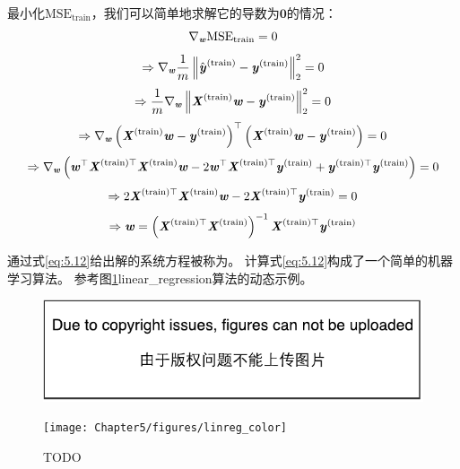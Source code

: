 最小化$\text{MSE}_{\text{train}}$，我们可以简单地求解它的导数为$\mathbf{0}$的情况：
\begin{equation}
\nabla_{\boldsymbol{\mathit{w}}} \text{MSE}_{\text{train}} = 0
\end{equation}
\begin{equation}
\Rightarrow \nabla_{\boldsymbol{\mathit{w}}} \frac{1}{m} \left\lVert \hat{\boldsymbol{\mathit{y}}}^{(\text{train})} - \boldsymbol{\mathit{y}}^{(\text{train})}\right\rVert_2^2 = 0
\end{equation}
\begin{equation}
\Rightarrow \frac{1}{m} \nabla_{\boldsymbol{\mathit{w}}} \left\lVert \boldsymbol{\mathit{X}}^{(\text{train})}\boldsymbol{\mathit{w}} - \boldsymbol{\mathit{y}}^{(\text{train})}\right\rVert_2^2 = 0
\end{equation}
\begin{equation}
\Rightarrow \nabla_{\boldsymbol{\mathit{w}}} \left( \boldsymbol{\mathit{X}}^{(\text{train})}\boldsymbol{\mathit{w}} - \boldsymbol{\mathit{y}}^{(\text{train})} \right)^\top \left( \boldsymbol{\mathit{X}}^{(\text{train})}\boldsymbol{\mathit{w}} - \boldsymbol{\mathit{y}}^{(\text{train})} \right) = 0
\end{equation}
\begin{equation}
\Rightarrow \nabla_{\boldsymbol{\mathit{w}}} \left( 
    \boldsymbol{\mathit{w}}^\top \boldsymbol{\mathit{X}}^{(\text{train})\top}\boldsymbol{\mathit{X}}^{(\text{train})}\boldsymbol{\mathit{w}} - 2\boldsymbol{\mathit{w}}^\top\boldsymbol{\mathit{X}}^{(\text{train})\top} \boldsymbol{\mathit{y}}^{(\text{train})} + \boldsymbol{\mathit{y}}^{(\text{train})\top}\boldsymbol{\mathit{y}}^{(\text{train})}  
  \right) = 0
\end{equation}
\begin{equation}
    \Rightarrow 2\boldsymbol{\mathit{X}}^{(\text{train})\top}\boldsymbol{\mathit{X}}^{(\text{train})} \boldsymbol{\mathit{w}}  -
    2\boldsymbol{\mathit{X}}^{(\text{train})\top} \boldsymbol{\mathit{y}}^{(\text{train})}  = 0
\end{equation}
\begin{equation}
\label{eq:5.12}
    \Rightarrow \boldsymbol{\mathit{w}} =  \left(\boldsymbol{\mathit{X}}^{(\text{train})\top}\boldsymbol{\mathit{X}}^{(\text{train})}
     \right)^{-1} \boldsymbol{\mathit{X}}^{(\text{train})\top} \boldsymbol{\mathit{y}}^{(\text{train})}
\end{equation}


通过式\ref{eq:5.12}给出解的系统方程被称为。
计算式\ref{eq:5.12}构成了一个简单的机器学习算法。
参考图\ref{fig:chap5_linreg}\gls{linear_regression}算法的动态示例。

\begin{figure}[!htb]
\ifOpenSource
\centerline{\includegraphics{figure.pdf}}
\else
\centerline{\texttt{[image: Chapter5/figures/linreg\_color]}}
\fi
\caption{TODO}
\label{fig:chap5_linreg}
\end{figure}

